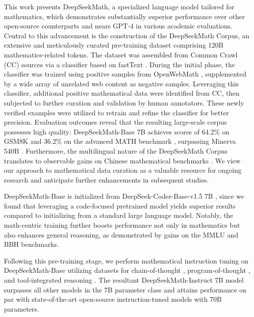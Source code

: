 This work presents DeepSeekMath, a specialized language model tailored for mathematics, which demonstrates substantially superior performance over other open-source counterparts and nears GPT-4 in various academic evaluations. Central to this advancement is the construction of the DeepSeekMath Corpus, an extensive and meticulously curated pre-training dataset comprising 120B mathematics-related tokens. The dataset was assembled from Common Crawl (CC) sources via a classifier based on fastText \citep{joulin2016fasttext}. During the initial phase, the classifier was trained using positive samples from OpenWebMath \citep{openwebmath}, supplemented by a wide array of unrelated web content as negative samples. Leveraging this classifier, additional positive mathematical data were identified from CC, then subjected to further curation and validation by human annotators. These newly verified examples were utilized to retrain and refine the classifier for better precision. Evaluation outcomes reveal that the resulting large-scale corpus possesses high quality: DeepSeekMath-Base 7B achieves scores of 64.2\% on GSM8K \citep{gsm8k} and 36.2\% on the advanced MATH benchmark \citep{MATH}, surpassing Minerva 540B \citep{minerva}. Furthermore, the multilingual nature of the DeepSeekMath Corpus translates to observable gains on Chinese mathematical benchmarks \citep{wei2023cmath,agieval}. We view our approach to mathematical data curation as a valuable resource for ongoing research and anticipate further enhancements in subsequent studies.

DeepSeekMath-Base is initialized from DeepSeek-Coder-Base-v1.5 7B \citep{deepseek-coder}, since we found that leveraging a code-focused pretrained model yields superior results compared to initializing from a standard large language model. Notably, the math-centric training further boosts performance not only in mathematics but also enhances general reasoning, as demonstrated by gains on the MMLU \citep{mmlu} and BBH \citep{bbh} benchmarks.

Following this pre-training stage, we perform mathematical instruction tuning on DeepSeekMath-Base utilizing datasets for chain-of-thought \citep{cot}, program-of-thought \citep{pot,pal}, and tool-integrated reasoning \citep{tora}. The resultant DeepSeekMath-Instruct 7B model surpasses all other models in the 7B parameter class and attains performance on par with state-of-the-art open-source instruction-tuned models with 70B parameters.

